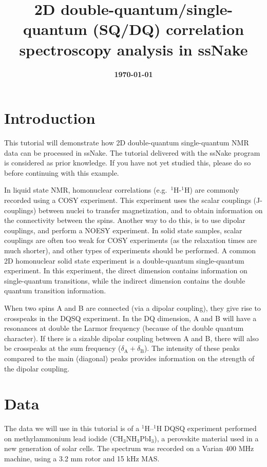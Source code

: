 \documentclass[11pt,a4paper]{article}
\title{\color{black}\fontfamily{SourceSansPro-LF}\bfseries 2D double-quantum/single-quantum (SQ/DQ)
correlation spectroscopy analysis in ssNake}
\author{}
\date{\color{black}\fontfamily{SourceSansPro-LF}\bfseries \today}
\begin{document}

\maketitle

\section{Introduction}
This tutorial will demonstrate how 2D double-quantum single-quantum NMR data can be processed in ssNake.
The tutorial delivered with the ssNake program is considered as prior knowledge.
If you have not yet studied this, please do so before continuing with this example.

In liquid state NMR, homonuclear correlations (e.g.\ $^{1}$H-$^1$H) are commonly recorded using a COSY experiment.
This experiment uses the scalar couplings (J-couplings) between nuclei to transfer magnetization, and to obtain information on the connectivity between the spins.
Another way to do this, is to use dipolar couplings, and perform a NOESY experiment.
In solid state samples, scalar couplings are often too weak for COSY experiments (as the relaxation times are much shorter), and other types of experiments should be performed.
A common 2D homonuclear solid state experiment is a double-quantum single-quantum experiment.
In this experiment, the direct dimension contains information on single-quantum transitions, while the indirect dimension contains the double quantum transition information. 

When two spins A and B are connected (via a dipolar coupling), they give rise to crosspeaks in the DQSQ experiment.
In the DQ dimension, A and B will have a resonances at double the Larmor frequency (because of the double quantum character).
If there is a sizable dipolar coupling between A and B, there will also be crosspeaks at the sum frequency ($\delta_\text{A} + \delta_\text{B}$).
The intensity of these peaks compared to the main (diagonal) peaks provides information on the strength of the dipolar coupling.

\section{Data}
The data we will use in this tutorial is of a $^1$H--$^1$H DQSQ experiment performed on methylammonium lead iodide (CH$_3$NH$_3$PbI$_3$), a perovskite material used in a new generation of solar cells.
The spectrum was recorded on a Varian 400 MHz machine, using a 3.2 mm rotor and 15 kHz MAS.
\end{document}
